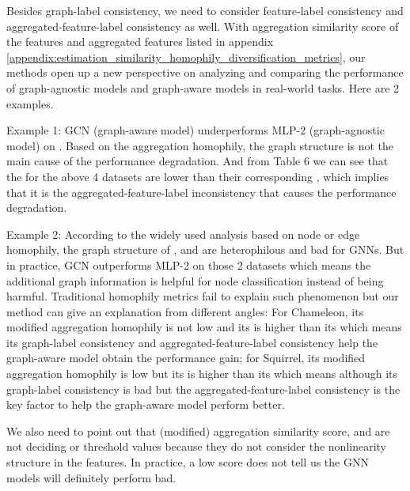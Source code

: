 \documentclass{article}
\newcommand{\0}{{\boldsymbol{0}}}
\newcommand{\6}{{\partial}}
\newcommand{\8}{{\infty}}
\newcommand{\4}{{\nabla}}
\begin{document}
Besides graph-label consistency, we need to consider feature-label consistency and aggregated-feature-label consistency as well. With aggregation similarity score of the features  and aggregated features  listed in appendix \ref{appendix:estimation_similarity_homophily_diversification_metrics}, our methods open up a new perspective on analyzing and comparing the performance of graph-agnostic models and graph-aware models in real-world tasks. Here are 2 examples.

Example 1: GCN (graph-aware model) underperforms MLP-2 (graph-agnostic model) on . Based on the aggregation homophily, the graph structure is not the main cause of the performance degradation. And from Table 6 we can see that the  for the above 4 datasets are lower than their corresponding , which implies that it is the aggregated-feature-label inconsistency that causes the performance degradation.

Example 2: According to the widely used analysis based on node or edge homophily, the graph structure of , and  are heterophilous and bad for GNNs. But in practice, GCN outperforms MLP-2 on those 2 datasets which means the additional graph information is helpful for node classification instead of being harmful. Traditional homophily metrics fail to explain such phenomenon but our method can give an explanation from different angles: For Chameleon, its modified aggregation homophily is not low and its  is higher than its  which means its graph-label consistency and aggregated-feature-label consistency help the graph-aware model obtain the performance gain; for Squirrel, its modified aggregation homophily is low but its  is higher than its  which means although its graph-label consistency is bad but the aggregated-feature-label consistency is the key factor to help the graph-aware model perform better.

We also need to point out that (modified) aggregation similarity score,  and  are not deciding or threshold values because they do not consider the nonlinearity structure in the features. In practice, a low score does not tell us the GNN models will definitely perform bad.
\end{document}
